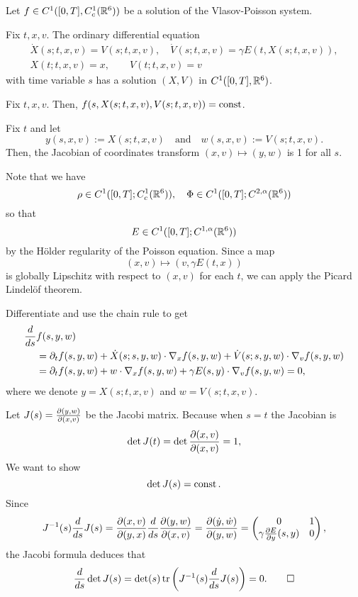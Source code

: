 \documentclass[11pt]{amsart}
\begin{document}
\begin{lem}
Let $f\in C^1([0,T],C_c^1(\mathbb{R}^6))$ be a solution of the Vlasov-Poisson system.
\begin{cond}
\item Fix $t,x,v$. The ordinary differential equation
\begin{gather*}
\dot X(s;t,x,v)=V(s;t,x,v),\quad\dot V(s;t,x,v)=\gamma E(t,X(s;t,x,v)),\\
X(t;t,x,v)=x,\qquad V(t;t,x,v)=v
\end{gather*}
with time variable $s$ has a solution $(X,V)$ in $C^1([0,T],\mathbb{R}^6)$.
\item Fix $t,x,v$. Then, $f(s,X(s;t,x,v),V(s;t,x,v))=\operatorname{const}$.
\item Fix $t$ and let
\[y(s,x,v):=X(s;t,x,v)\quad\text{and}\quad w(s,x,v):=V(s;t,x,v).\]
Then, the Jacobian of coordinates transform $(x,v)\mapsto(y,w)$ is 1 for all $s$.
\end{cond}
\end{lem}
\begin{pfs}
\item
Note that we have
\[\rho\in C^1([0,T];C_c^1(\mathbb{R}^6)),\quad\Phi\in C^1([0,T];C^{2,\alpha}(\mathbb{R}^6))\]
so that
\[E\in C^1([0,T];C^{1,\alpha}(\mathbb{R}^6))\]
by the H\"older regularity of the Poisson equation.
Since a map
\[(x,v)\mapsto(v,\gamma E(t,x))\]
is globally Lipschitz with respect to $(x,v)$ for each $t$, we can apply the Picard Lindel\"of theorem.

\item
Differentiate and use the chain rule to get
\begin{align*}
\dd{s}&f(s,y,w)\\
&=\pd_tf(s,y,w)+\dot X(s;s,y,w)\cdot\del_xf(s,y,w)+\dot V(s;s,y,w)\cdot\del_vf(s,y,w)\\
&=\pd_tf(s,y,w)+w\cdot\del_xf(s,y,w)+\gamma E(s,y)\cdot\del_vf(s,y,w)=0,
\end{align*}
where we denote $y=X(s;t,x,v)$ and $w=V(s;t,x,v)$.

\item
Let $J(s)=\pd{(y,w)}{(x,v)}$ be the Jacobi matrix.
Because when $s=t$ the Jacobian is
\[\det J(t)=\det\pd{(x,v)}{(x,v)}=1,\]
We want to show
\[\det J(s)=\operatorname{const}.\]
Since
\[J^{-1}(s)\dd{s}J(s)=\pd{(x,v)}{(y,x)}\dd{s}\pd{(y,w)}{(x,v)}=\pd{(\dot y,\dot w)}{(y,w)}=\mat{0&1\\\gamma\pd{E}{y}(s,y)&0},\]
the Jacobi formula deduces that
\[\dd{s}\det J(s)=\det(s)\tr\left(J^{-1}(s)\dd{s}J(s)\right)=0.\qedhere\]
\end{pfs}
\end{document}
